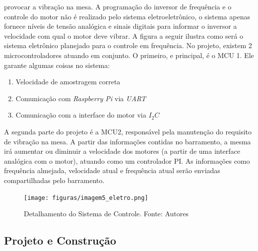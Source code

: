 provocar a vibração na mesa. A programação do inversor de frequência e o controle do motor não é realizado pelo sistema 
eletroeletrônico, o sistema apenas fornece níveis de tensão analógica e sinais digitais para informar o inversor a velocidade com 
qual o motor deve vibrar.
A figura a seguir ilustra como será o sistema eletrônico planejado para o controle em frequência. No projeto, existem 2 
microcontroladores atuando em conjunto. O primeiro, e principal, é o MCU 1. Ele garante algumas coisas no sistema:
\begin{enumerate}
\item Velocidade de amostragem correta
\item Comunicação com \textit{Raspberry Pi} via \textit{UART}
\item Comunicação com a interface do motor via \textit{$I_{2} C$}
\end{enumerate}
A segunda parte do projeto é a MCU2, responsável pela manutenção do requisito de vibração na mesa. A partir das 
informações contidas no barramento, a mesma irá aumentar ou diminuir a velocidade dos motores (a partir de uma interface 
analógica com o motor), atuando como um controlador PI. As informações como frequência almejada, velocidade atual e 
frequência atual serão enviadas compartilhadas pelo barramento.
\begin{figure}[H]
\centering
\texttt{[image: figuras/imagem5\_eletro.png]}
\caption{Detalhamento do Sistema de Controle. Fonte: Autores}
\label{fig:det_control_system}
\end{figure}

\subsection{Projeto e Construção}

